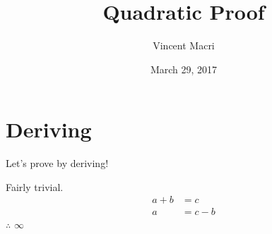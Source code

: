 \documentclass[12pt]{article} %
\title{Quadratic Proof} %
\author{Vincent Macri} %
\date{March 29, 2017} %
\begin{document}
	\maketitle %
	\tableofcontents %
	\newpage %

	\section{Deriving} %
	Let's prove by deriving!

	Fairly trivial.
	\begin{align*}
		a + b &= c\\
		a &= c - b
	\end{align*}
	$\therefore$ $\infty$
\end{document}
